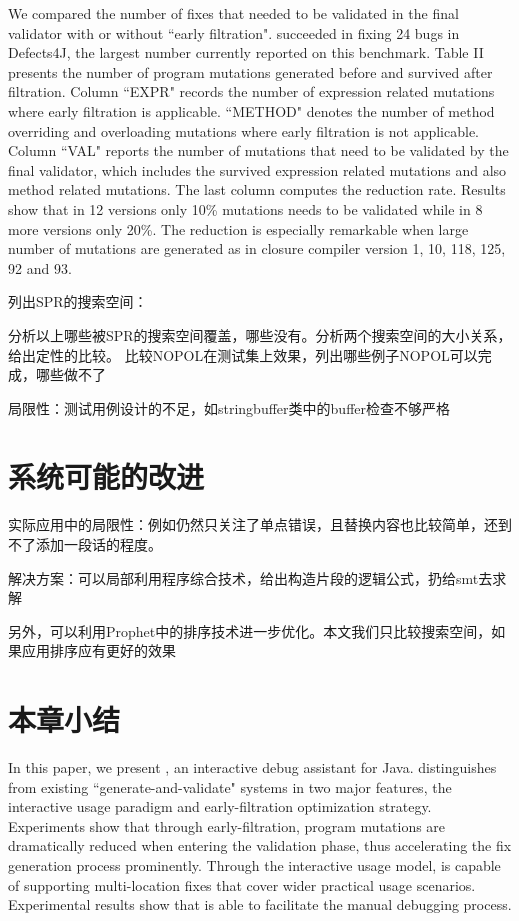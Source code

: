 We compared the number of fixes that needed to be validated in the final validator with or without ``early filtration". \SmartDebug succeeded in fixing 24 bugs in Defects4J, the largest number currently reported on this benchmark. Table II presents the number of program mutations generated before and survived after filtration. Column ``EXPR" records the number of expression related mutations where early filtration is applicable. ``METHOD" denotes the number of method overriding and overloading mutations where early filtration is not applicable. Column ``VAL" reports the number of mutations that need to be validated by the final validator, which includes the survived expression related mutations and also method related mutations. The last column computes the reduction rate. Results show that in 12 versions only 10\% mutations needs to be validated while in 8 more versions only 20\%. The reduction is especially remarkable when large number of mutations are generated as in closure compiler version 1, 10, 118, 125, 92 and 93.




列出SPR的搜索空间：


分析以上哪些被SPR的搜索空间覆盖，哪些没有。分析两个搜索空间的大小关系，给出定性的比较。
比较NOPOL在测试集上效果，列出哪些例子NOPOL可以完成，哪些做不了

局限性：测试用例设计的不足，如stringbuffer类中的buffer检查不够严格

\section{系统可能的改进}
实际应用中的局限性：例如仍然只关注了单点错误，且替换内容也比较简单，还到不了添加一段话的程度。

解决方案：可以局部利用程序综合技术，给出构造片段的逻辑公式，扔给smt去求解

另外，可以利用Prophet中的排序技术进一步优化。本文我们只比较搜索空间，如果应用排序应有更好的效果

\section{本章小结}%
In this paper, we present \SmartDebug, an interactive debug assistant for Java. \SmartDebug distinguishes from existing ``generate-and-validate" systems in two major features, the interactive usage paradigm and early-filtration optimization strategy. Experiments show that through early-filtration, program mutations are dramatically reduced when entering the validation phase, thus accelerating the fix generation process prominently. Through the interactive usage model, \SmartDebug is capable of supporting multi-location fixes that cover wider practical usage scenarios. Experimental results show that \SmartDebug is able to facilitate the manual debugging process.
